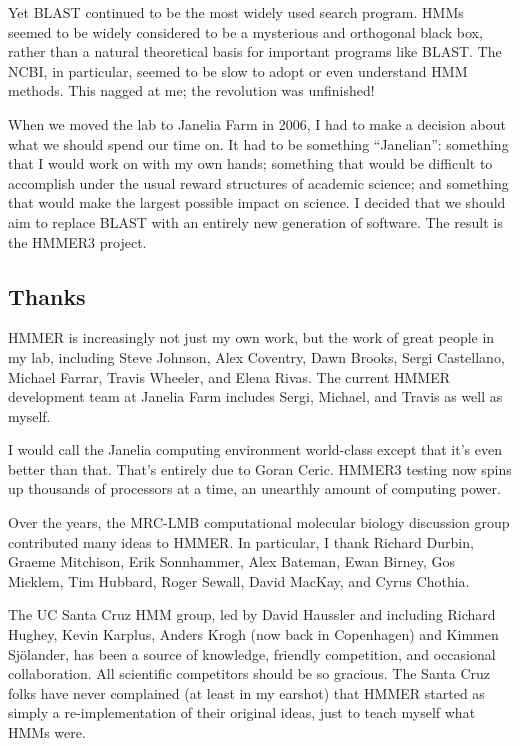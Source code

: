 Yet BLAST continued to be the most widely used search program.  HMMs
seemed to be widely considered to be a mysterious and orthogonal black
box, rather than a natural theoretical basis for important programs
like BLAST. The NCBI, in particular, seemed to be slow to adopt or
even understand HMM methods. This nagged at me; the revolution was
unfinished!

When we moved the lab to Janelia Farm in 2006, I had to make a
decision about what we should spend our time on. It had to be
something ``Janelian'': something that I would work on with my own
hands; something that would be difficult to accomplish under the usual
reward structures of academic science; and something that would make
the largest possible impact on science. I decided that we should aim
to replace BLAST with an entirely new generation of software. The
result is the HMMER3 project.

\subsection{Thanks}

HMMER is increasingly not just my own work, but the work of great
people in my lab, including Steve Johnson, Alex Coventry, Dawn Brooks,
Sergi Castellano, Michael Farrar, Travis Wheeler, and Elena Rivas.
The current HMMER development team at Janelia Farm includes Sergi,
Michael, and Travis as well as myself.

I would call the Janelia computing environment world-class except that
it's even better than that. That's entirely due to Goran Ceric. HMMER3
testing now spins up thousands of processors at a time, an unearthly
amount of computing power.

Over the years, the MRC-LMB computational molecular biology discussion
group contributed many ideas to HMMER. In particular, I thank Richard
Durbin, Graeme Mitchison, Erik Sonnhammer, Alex Bateman, Ewan Birney,
Gos Micklem, Tim Hubbard, Roger Sewall, David MacKay, and Cyrus
Chothia.

The UC Santa Cruz HMM group, led by David Haussler and including
Richard Hughey, Kevin Karplus, Anders Krogh (now back in Copenhagen)
and Kimmen Sj\"{o}lander, has been a source of knowledge, friendly
competition, and occasional collaboration. All scientific competitors
should be so gracious. The Santa Cruz folks have never complained (at
least in my earshot) that HMMER started as simply a re-implementation
of their original ideas, just to teach myself what HMMs were.

